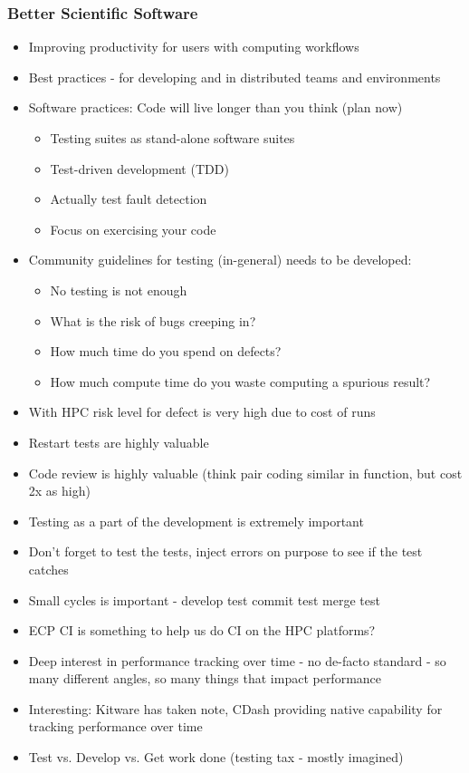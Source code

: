 \begin{frame}\frametitle{Better Scientific Software}
\begin{itemize}
\item Improving productivity for users with computing workflows
\item Best practices - for developing and in distributed teams and environments
\item Software practices: Code will live longer than you think (plan now)
\begin{itemize}
\item Testing suites as stand-alone software suites
\item Test-driven development (TDD)
\item Actually test fault detection
\item Focus on exercising your code
\end{itemize}
\item Community guidelines for testing (in-general) needs to be developed:
\begin{itemize}
\item No testing is not enough
\item What is the risk of bugs creeping in?
\item How much time do you spend on defects?
\item How much compute time do you waste computing a spurious result?
\end{itemize}
\item With HPC risk level for defect is very high due to cost of runs
\item Restart tests are highly valuable
\item Code review is highly valuable (think pair coding similar in function, but cost 2x as high)
\item Testing as a part of the development is extremely important
\item Don't forget to test the tests, inject errors on purpose to see if the test catches
\item Small cycles is important - develop test commit test merge test
\item ECP CI is something to help us do CI on the HPC platforms?
\item Deep interest in performance tracking over time - no de-facto standard - so many different angles, so many things that impact performance
\item Interesting: Kitware has taken note, CDash providing native capability for tracking performance over time
\item Test vs. Develop vs. Get work done (testing tax - mostly imagined)
\end{itemize}
\end{frame}

